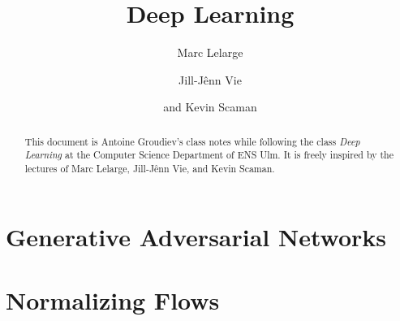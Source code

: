 \documentclass[toc, titlepaged]{../cs-classes/cs-classes}
\title{Deep Learning}
\author{Marc Lelarge\and Jill-Jênn Vie\and and Kevin Scaman}
\begin{document}
\begin{abstract}
    This document is Antoine Groudiev's class notes while following the class \emph{Deep Learning} at the Computer Science Department of ENS Ulm. It is freely inspired by the lectures of Marc Lelarge, Jill-Jênn Vie, and Kevin Scaman. 
\end{abstract}





% 








\section{Generative Adversarial Networks}

\section{Normalizing Flows}
\end{document}
